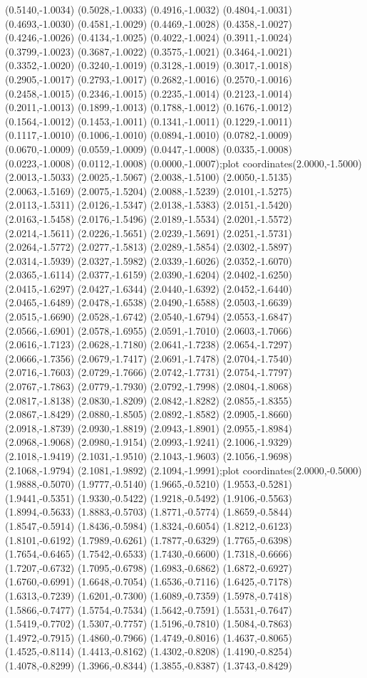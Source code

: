 {(0.5140,-1.0034) (0.5028,-1.0033) (0.4916,-1.0032) (0.4804,-1.0031) (0.4693,-1.0030) (0.4581,-1.0029) (0.4469,-1.0028) (0.4358,-1.0027) (0.4246,-1.0026) (0.4134,-1.0025) (0.4022,-1.0024) (0.3911,-1.0024) (0.3799,-1.0023) (0.3687,-1.0022) (0.3575,-1.0021) (0.3464,-1.0021) (0.3352,-1.0020) (0.3240,-1.0019) (0.3128,-1.0019) (0.3017,-1.0018) (0.2905,-1.0017) (0.2793,-1.0017) (0.2682,-1.0016) (0.2570,-1.0016) (0.2458,-1.0015) (0.2346,-1.0015) (0.2235,-1.0014) (0.2123,-1.0014) (0.2011,-1.0013) (0.1899,-1.0013) (0.1788,-1.0012) (0.1676,-1.0012) (0.1564,-1.0012) (0.1453,-1.0011) (0.1341,-1.0011) (0.1229,-1.0011) (0.1117,-1.0010) (0.1006,-1.0010) (0.0894,-1.0010) (0.0782,-1.0009) (0.0670,-1.0009) (0.0559,-1.0009) (0.0447,-1.0008) (0.0335,-1.0008) (0.0223,-1.0008) (0.0112,-1.0008) (0.0000,-1.0007)};plot coordinates{(2.0000,-1.5000) (2.0013,-1.5033) (2.0025,-1.5067) (2.0038,-1.5100) (2.0050,-1.5135) (2.0063,-1.5169) (2.0075,-1.5204) (2.0088,-1.5239) (2.0101,-1.5275) (2.0113,-1.5311) (2.0126,-1.5347) (2.0138,-1.5383) (2.0151,-1.5420) (2.0163,-1.5458) (2.0176,-1.5496) (2.0189,-1.5534) (2.0201,-1.5572) (2.0214,-1.5611) (2.0226,-1.5651) (2.0239,-1.5691) (2.0251,-1.5731) (2.0264,-1.5772) (2.0277,-1.5813) (2.0289,-1.5854) (2.0302,-1.5897) (2.0314,-1.5939) (2.0327,-1.5982) (2.0339,-1.6026) (2.0352,-1.6070) (2.0365,-1.6114) (2.0377,-1.6159) (2.0390,-1.6204) (2.0402,-1.6250) (2.0415,-1.6297) (2.0427,-1.6344) (2.0440,-1.6392) (2.0452,-1.6440) (2.0465,-1.6489) (2.0478,-1.6538) (2.0490,-1.6588) (2.0503,-1.6639) (2.0515,-1.6690) (2.0528,-1.6742) (2.0540,-1.6794) (2.0553,-1.6847) (2.0566,-1.6901) (2.0578,-1.6955) (2.0591,-1.7010) (2.0603,-1.7066) (2.0616,-1.7123) (2.0628,-1.7180) (2.0641,-1.7238) (2.0654,-1.7297) (2.0666,-1.7356) (2.0679,-1.7417) (2.0691,-1.7478) (2.0704,-1.7540) (2.0716,-1.7603) (2.0729,-1.7666) (2.0742,-1.7731) (2.0754,-1.7797) (2.0767,-1.7863) (2.0779,-1.7930) (2.0792,-1.7998) (2.0804,-1.8068) (2.0817,-1.8138) (2.0830,-1.8209) (2.0842,-1.8282) (2.0855,-1.8355) (2.0867,-1.8429) (2.0880,-1.8505) (2.0892,-1.8582) (2.0905,-1.8660) (2.0918,-1.8739) (2.0930,-1.8819) (2.0943,-1.8901) (2.0955,-1.8984) (2.0968,-1.9068) (2.0980,-1.9154) (2.0993,-1.9241) (2.1006,-1.9329) (2.1018,-1.9419) (2.1031,-1.9510) (2.1043,-1.9603) (2.1056,-1.9698) (2.1068,-1.9794) (2.1081,-1.9892) (2.1094,-1.9991)};plot coordinates{(2.0000,-0.5000) (1.9888,-0.5070) (1.9777,-0.5140) (1.9665,-0.5210) (1.9553,-0.5281) (1.9441,-0.5351) (1.9330,-0.5422) (1.9218,-0.5492) (1.9106,-0.5563) (1.8994,-0.5633) (1.8883,-0.5703) (1.8771,-0.5774) (1.8659,-0.5844) (1.8547,-0.5914) (1.8436,-0.5984) (1.8324,-0.6054) (1.8212,-0.6123) (1.8101,-0.6192) (1.7989,-0.6261) (1.7877,-0.6329) (1.7765,-0.6398) (1.7654,-0.6465) (1.7542,-0.6533) (1.7430,-0.6600) (1.7318,-0.6666) (1.7207,-0.6732) (1.7095,-0.6798) (1.6983,-0.6862) (1.6872,-0.6927) (1.6760,-0.6991) (1.6648,-0.7054) (1.6536,-0.7116) (1.6425,-0.7178) (1.6313,-0.7239) (1.6201,-0.7300) (1.6089,-0.7359) (1.5978,-0.7418) (1.5866,-0.7477) (1.5754,-0.7534) (1.5642,-0.7591) (1.5531,-0.7647) (1.5419,-0.7702) (1.5307,-0.7757) (1.5196,-0.7810) (1.5084,-0.7863) (1.4972,-0.7915) (1.4860,-0.7966) (1.4749,-0.8016) (1.4637,-0.8065) (1.4525,-0.8114) (1.4413,-0.8162) (1.4302,-0.8208) (1.4190,-0.8254) (1.4078,-0.8299) (1.3966,-0.8344) (1.3855,-0.8387) (1.3743,-0.8429) }
